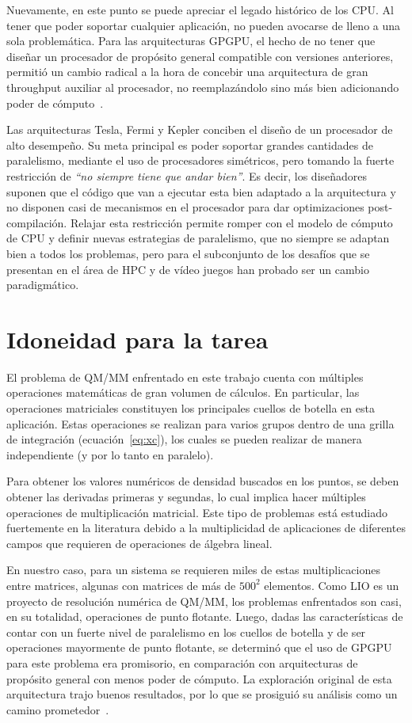Nuevamente, en este punto se puede apreciar el legado hist\'orico de los CPU.
Al tener que poder soportar cualquier aplicaci\'on, no pueden avocarse de lleno a una sola problem\'atica.
Para las arquitecturas GPGPU, el hecho de no tener que dise\~nar un procesador de prop\'osito general compatible con versiones anteriores, permiti\'o un cambio radical a la hora de concebir una arquitectura de gran throughput auxiliar al procesador, no reemplaz\'andolo sino m\'as bien adicionando poder de c\'omputo~\cite{GlaskowskyFermi}.

Las arquitecturas Tesla, Fermi y Kepler conciben el dise\~no de un procesador de alto desempe\~no.
Su meta principal es poder soportar grandes cantidades de paralelismo, mediante el uso de procesadores sim\'etricos, pero tomando la fuerte restricci\'on de \textsl{``no siempre tiene que andar bien''}.
Es decir, los dise\~nadores suponen que el c\'odigo que van a ejecutar esta bien adaptado a la arquitectura y no disponen casi de mecanismos en el procesador para dar optimizaciones post-compilaci\'on.
Relajar esta restricci\'on permite romper con el modelo de c\'omputo de CPU y definir nuevas estrategias de paralelismo, que no siempre se adaptan bien a todos los problemas, pero para el subconjunto de los desaf\'ios que se presentan en el \'area de HPC y de v\'ideo juegos han probado ser un cambio paradigm\'atico.

\section{Idoneidad para la tarea}

El problema de QM/MM enfrentado en este trabajo cuenta con m\'ultiples operaciones matem\'aticas de gran volumen de c\'alculos.
En particular, las operaciones matriciales constituyen los principales cuellos de botella en esta aplicaci\'on.
Estas operaciones se realizan para varios grupos dentro de una grilla de integraci\'on (ecuaci\'on~\ref{eq:xc}), los cuales se pueden realizar de manera independiente (y por lo tanto en paralelo).

Para obtener los valores num\'ericos de densidad buscados en los puntos, se deben obtener las derivadas primeras y segundas, lo cual implica hacer m\'ultiples operaciones de multiplicaci\'on matricial.
Este tipo de problemas est\'a estudiado fuertemente en la literatura debido a la multiplicidad de aplicaciones de diferentes campos que requieren de operaciones de \'algebra lineal.

En nuestro caso, para un sistema se requieren miles de estas multiplicaciones entre matrices, algunas con matrices de m\'as de $500^2$ elementos.
Como LIO es un proyecto de resoluci\'on num\'erica de QM/MM, los problemas enfrentados son casi, en su totalidad, operaciones de punto flotante.
Luego, dadas las caracter\'isticas de contar con un fuerte nivel de paralelismo en los cuellos de botella y de ser operaciones mayormente de punto flotante, se determin\'o que el uso de GPGPU para este problema era promisorio, en comparaci\'on con arquitecturas de prop\'osito general con menos poder de c\'omputo. La exploraci\'on original de esta arquitectura trajo buenos resultados, por lo que se prosigui\'o su an\'alisis como un camino prometedor~\cite{TesisNitsche}.
